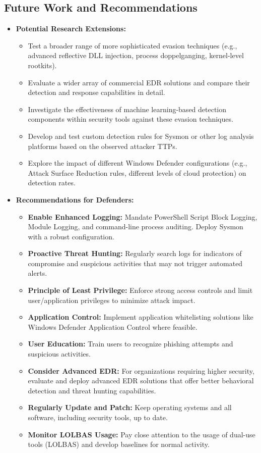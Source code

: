 \documentclass[11pt]{article}
\begin{document}
	\subsection{Future Work and Recommendations}
	\begin{itemize}
		\item \textbf{Potential Research Extensions:}
		\begin{itemize}
			\item Test a broader range of more sophisticated evasion techniques (e.g., advanced reflective DLL injection, process doppelganging, kernel-level rootkits).
			\item Evaluate a wider array of commercial EDR solutions and compare their detection and response capabilities in detail.
			\item Investigate the effectiveness of machine learning-based detection components within security tools against these evasion techniques.
			\item Develop and test custom detection rules for Sysmon or other log analysis platforms based on the observed attacker TTPs.
			\item Explore the impact of different Windows Defender configurations (e.g., Attack Surface Reduction rules, different levels of cloud protection) on detection rates.
		\end{itemize}
		\item \textbf{Recommendations for Defenders:}
		\begin{itemize}
			\item \textbf{Enable Enhanced Logging:} Mandate PowerShell Script Block Logging, Module Logging, and command-line process auditing. Deploy Sysmon with a robust configuration.
			\item \textbf{Proactive Threat Hunting:} Regularly search logs for indicators of compromise and suspicious activities that may not trigger automated alerts.
			\item \textbf{Principle of Least Privilege:} Enforce strong access controls and limit user/application privileges to minimize attack impact.
			\item \textbf{Application Control:} Implement application whitelisting solutions like Windows Defender Application Control where feasible.
			\item \textbf{User Education:} Train users to recognize phishing attempts and suspicious activities.
			\item \textbf{Consider Advanced EDR:} For organizations requiring higher security, evaluate and deploy advanced EDR solutions that offer better behavioral detection and threat hunting capabilities.
			\item \textbf{Regularly Update and Patch:} Keep operating systems and all software, including security tools, up to date.
			\item \textbf{Monitor LOLBAS Usage:} Pay close attention to the usage of dual-use tools (LOLBAS) and develop baselines for normal activity.
		\end{itemize}
	\end{itemize}
	\newpage
	
\end{document}
